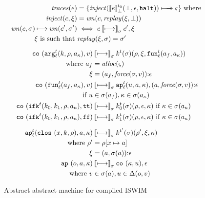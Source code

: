 \documentclass[preprint,onecolumn,9pt]{sigplanconf} %
\begin{document}
\begin{figure}
\small
\begin{gather*}
\begin{align*}
\traces(\mexp) &= \setof{ \inject(\compile{\mexp}^\mtcntr_\bot(\bot,\epsilon,\kmt)) \multimachstep \mstate}
                    \text{ where } \\
\inject(c,\msdiff) &= \wn(c,\replay(\msdiff,\bot)) \\
\wn(c,\msto) \machstep \wn(c',\msto') &\iff c \cmachstep_\msto c',\msdiff \\
\msdiff \text{ is such that } &\replay(\msdiff,\msto) = \msto'
\end{align*}
\\[2mm]
\begin{align*}
\co{\kar[^\mcntr_\mlab]{\mcomp,\menv,\mkaddr},\mval} & \cmachstep_\msto
\mcomp^\mcntr(\msto)(\menv,\msdiff,\kfn[^\mcntr_\mlab]{\maddr_f,\mkaddr}) \\
\text{ where } \maddr_f &= \alloc(\mstate) \\
               \msdiff &= \cons{\ttuple{\maddr_f}{\force(\msto,\mval)}}{\epsilon}
\\
\co{\kfn[^\mcntr_\mlab]{\maddr_f,\mkaddr},\mval} & \cmachstep_\msto
\ap[^\mcntr_\mlab]{\mvalx{u},\maddr,\mkont},\cons{\ttuple{\maddr}{\force(\msto,\mval)}}{\epsilon} \\
\text{ if }\mvalx{u} &\in \msto(\maddr_f), \mkont \in \msto(\mkaddr)
\\
\co{\kif[^\mcntr]{\mcompi0,\mcompi1,\menv,\mkaddr},\strue} & \cmachstep_\msto
\mcompi{0}^\mcntr(\msto)(\menv,\epsilon,\mkont)
\text{ if }\mkont\in\msto(\mkaddr)
\\
\co{\kif[^\mcntr]{\mcompi0,\mcompi1,\menv,\mkaddr},\sfalse} & \cmachstep_\msto
\mcompi{1}^\mcntr(\msto)(\menv,\epsilon,\mkont)
\text{ if }\mkont\in\msto(\mkaddr)
\\[2mm]
\ap[^\mcntr_\mlab]{\clos{\mvar,\mcomp,\menv},\maddr,\mkont} & \cmachstep_\msto
\mcomp^{\mcntr'}(\msto)(\menv',\msdiff,\mkont) \\
\text{ where }\menv' &= \menv[\mvar\mapsto\maddr] \\
              \msdiff &= \cons{\ttuple{\maddr}{\msto(\maddr)}}{\epsilon}
\\
\ap{\mop,\maddr,\mkont} & \cmachstep_\msto
\co{\mkont,\mvalx{u}},\epsilon \\
\text{ where } \mval &\in \spchoice{\msto(\maddr)}{\msto(\maddr)}, \mvalx{u}\in\interpdelta(\mop,\mval)
\end{align*}
\end{gather*}
\caption{Abstract abstract machine for compiled ISWIM}
\label{fig:caam}
\end{figure}
\end{document}
